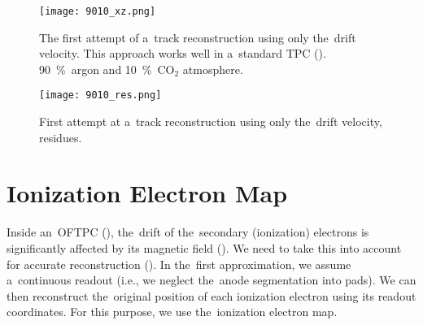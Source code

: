 		\begin{figure}[H]
			\centering
			\texttt{[image: 9010\_xz.png]}
			\caption{The first attempt of a~track reconstruction using only the~drift velocity. This approach works well in a~standard \ac{TPC} (). 90~\%~argon and 10~\%~CO$_2$ atmosphere. }
			\label{fig:9010xz}
		\end{figure}
		
		\begin{figure}[H]
			\centering
			\texttt{[image: 9010\_res.png]}
			\caption{First attempt at a~track reconstruction using only the~drift velocity, residues. }
			\label{fig:9010res}
		\end{figure}
	
	\section{Ionization Electron Map}
	\label{sec:map}
		Inside an~\ac{OFTPC} (), the~drift of the~secondary (ionization) electrons is significantly affected by its magnetic field (). We need to take this into account for accurate reconstruction (). In the~first approximation, we assume a~continuous readout (i.e., we neglect the~anode segmentation into pads). We can then reconstruct the~original position of each ionization electron using its readout coordinates. For this purpose, we use the~ionization electron map.
		
